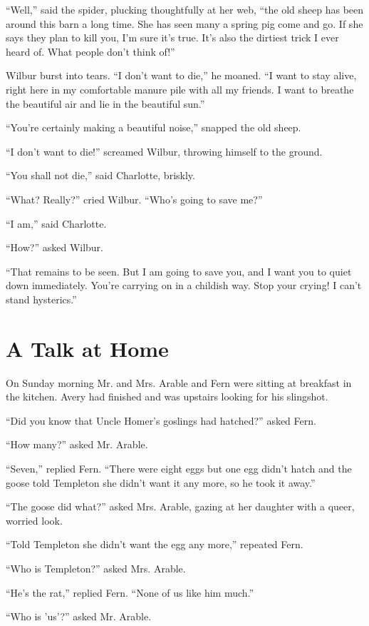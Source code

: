 \documentclass[a4paper, oneside]{book}
\begin{document}
 ``Well,'' said the spider, plucking thoughtfully at her web, ``the old
sheep has been around this barn a long time. She has seen many a
spring pig come and go. If she says they plan to kill you, I'm sure
it's true. It's also the dirtiest trick I ever heard of. What people
don't think of!'' 

 Wilbur burst into tears. ``I don't want to die,'' he moaned. ``I want
to stay alive, right here in my comfortable manure pile with all my
friends. I want to breathe the beautiful air and lie in the beautiful
sun.''

 ``You're certainly making a beautiful noise,'' snapped the old sheep.

 ``I don't want to die!'' screamed Wilbur, throwing himself to the
ground.

 ``You shall not die,'' said Charlotte, briskly.

 ``What? Really?'' cried Wilbur. ``Who's going to save me?''

 ``I am,'' said Charlotte.

 ``How?'' asked Wilbur.

 ``That remains to be seen. But I am going to save you, and I want
you to quiet down immediately. You're carrying on in a childish
way. Stop your crying! I can't stand hysterics.'' 

  \chapter{A Talk at Home}
 On Sunday morning Mr. and Mrs. Arable and Fern were sitting at
breakfast in the kitchen. Avery had finished and was upstairs
looking for his slingshot.

 ``Did you know that Uncle Homer's goslings had hatched?'' asked
Fern.

 ``How many?'' asked Mr. Arable.

 ``Seven,'' replied Fern. ``There were eight eggs but one egg didn't
hatch and the goose told Templeton she didn't want it any more, so
he took it away.''

 ``The goose did what?'' asked Mrs. Arable, gazing at her daughter
with a queer, worried look.

 ``Told Templeton she didn't want the egg any more,'' repeated
Fern.

 ``Who is Templeton?'' asked Mrs. Arable.

 ``He's the rat,'' replied Fern. ``None of us like him much.''

 ``Who is 'us'?'' asked Mr. Arable.
\end{document}
